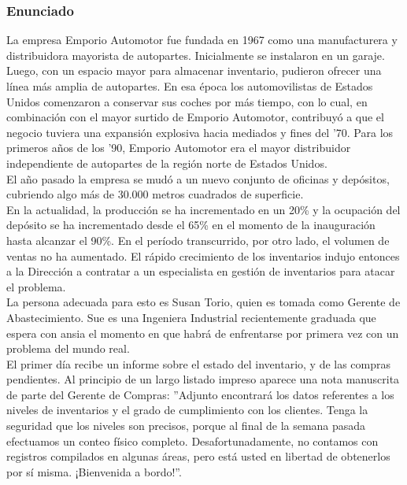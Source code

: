 \documentclass[a4paper,10pt,titlepage]{article}
\begin{document}
\subsubsection{Enunciado}

La empresa Emporio Automotor fue fundada en 1967 como una manufacturera y distribuidora mayorista de autopartes. Inicialmente se instalaron en un garaje. Luego, 
con un espacio mayor para almacenar inventario, pudieron ofrecer una l\' inea m\' as amplia de autopartes. En esa \'epoca los automovilistas de Estados Unidos 
comenzaron a conservar sus coches por m\'as tiempo, con lo cual, en combinaci\'on con el mayor surtido de Emporio Automotor, contribuy\'o a que el negocio tuviera una 
expansi\'on explosiva hacia mediados y fines del '70. Para los primeros años de los ’90, Emporio Automotor era el mayor distribuidor independiente de autopartes de 
la regi\'on norte de Estados Unidos.\\

El año pasado la empresa se mud\'o a un nuevo conjunto de oficinas y dep\'ositos, cubriendo algo m\'as de 30.000 metros cuadrados de superficie.\\

En la actualidad, la producci\'on se ha incrementado en un 20\% y la ocupaci\'on del dep\'osito se ha incrementado desde el 65\% en el momento de la inauguraci\'on 
hasta alcanzar el 90\%. En el per\'iodo transcurrido, por otro lado, el volumen de ventas no ha aumentado. El r\'apido crecimiento de los inventarios indujo 
entonces a la Direcci\'on a contratar a un especialista en gesti\'on de inventarios para atacar el problema.\\

La persona adecuada para esto es Susan Torio, quien es tomada como Gerente de Abastecimiento. Sue es una Ingeniera Industrial recientemente graduada que espera con 
ansia el momento en que habr\'a de enfrentarse por primera vez con un problema del mundo real.\\

El primer d\'ia recibe un informe sobre el estado del inventario, y de las compras pendientes. Al principio de un largo listado impreso aparece una nota manuscrita de 
parte del Gerente de Compras: ''Adjunto encontrar\'a los datos referentes a los niveles de inventarios y el grado de cumplimiento con los clientes. Tenga la seguridad 
que los niveles son precisos, porque al final de la semana pasada efectuamos un conteo f\'isico completo. Desafortunadamente, no contamos con registros compilados en 
algunas \'areas, pero est\'a usted en libertad de obtenerlos por s\'i misma. ¡Bienvenida a bordo!''.\\
\end{document}
